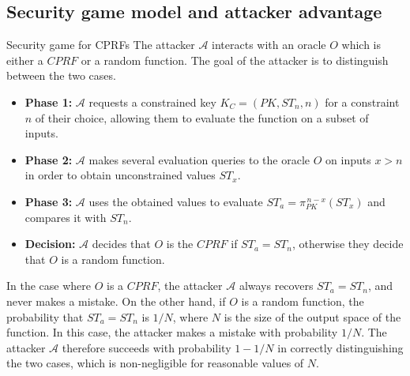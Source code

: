 \documentclass[9pt]{extarticle}
\begin{document}
\subsection{Security game model and attacker advantage}
\begin{defbox}{Security game for CPRFs}
The attacker $\mathcal{A}$ interacts with an oracle $O$ which is either a $CPRF$ or a random function. 
The goal of the attacker is to distinguish between the two cases.
\begin{itemize}
\item \textbf{Phase 1:} $\mathcal{A}$ requests a constrained key $K_C = (PK, ST_n, n)$ for a constraint $n$ of their choice, allowing them to evaluate the function on a subset of inputs.
\item \textbf{Phase 2:} $\mathcal{A}$ makes several evaluation queries to the oracle $O$ on inputs $x > n$ in order to obtain unconstrained values $ST_x$.
\item \textbf{Phase 3:} $\mathcal{A}$ uses the obtained values to evaluate $ST_a = \pi_{PK}^{\,n-x}(ST_x)$ and compares it with $ST_n$.
\item \textbf{Decision:} $\mathcal{A}$ decides that $O$ is the $CPRF$ if $ST_a = ST_n$, otherwise they decide that $O$ is a random function.
\end{itemize}
In the case where $O$ is a $CPRF$, the attacker $\mathcal{A}$ always recovers $ST_a = ST_n$, and never makes a mistake. On the other hand, if $O$ is a random function, the probability that $ST_a = ST_n$ is $1/N$, where $N$ is the size of the output space of the function. In this case, the attacker makes a mistake with probability $1/N$.
The attacker $\mathcal{A}$ therefore succeeds with probability $1 - 1/N$ in correctly distinguishing the two cases, which is non-negligible for reasonable values of $N$.\\

\begin{figure}[H]
  \centering
{}
\end{figure}
\end{defbox}
\end{document}
